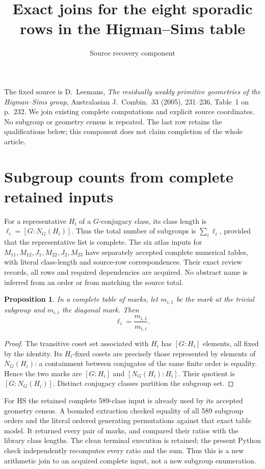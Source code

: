 \documentclass[11pt]{article}
\title{Exact joins for the eight sporadic rows in the Higman--Sims table}
\author{Source recovery component}
\date{}
\newtheorem{proposition}{Proposition}
\begin{document}
\maketitle
\noindent The fixed source is D.~Leemans, \emph{The residually weakly primitive
geometries of the Higman--Sims group}, Australasian J.~Combin.\ 33 (2005),
231--236, Table~1 on p.~232. We join existing complete computations and
explicit source coordinates. No subgroup or geometry census is repeated.
The last row retains the qualifications below; this component does not
claim completion of the whole article.

\section{Subgroup counts from complete retained inputs}
For a representative $H_i$ of a $G$-conjugacy class, its class length is
$\ell_i=[G:N_G(H_i)]$. Thus the total number of subgroups is
$\sum_i\ell_i$, provided that the representative list is complete.
The six atlas inputs for $M_{11},M_{12},J_1,M_{22},J_2,M_{23}$ have
separately accepted complete numerical tables, with literal class-length
and source-row correspondences. Their exact review records, all rows and
required dependencies are acquired. No abstract name is inferred from an
order or from matching the source total.

\begin{proposition}
In a complete table of marks, let $m_{i,1}$ be the mark at the trivial
subgroup and $m_{i,i}$ the diagonal mark. Then
\[
 \ell_i=\frac{m_{i,1}}{m_{i,i}}.
\]
\end{proposition}
\begin{proof}
The transitive coset set associated with $H_i$ has $[G:H_i]$ elements,
all fixed by the identity. Its $H_i$-fixed cosets are precisely those
represented by elements of $N_G(H_i)$: a containment between conjugates
of the same finite order is equality. Hence the two marks are
$[G:H_i]$ and $[N_G(H_i):H_i]$. Their quotient is $[G:N_G(H_i)]$.
Distinct conjugacy classes partition the subgroup set.
\end{proof}

For HS the retained complete 589-class input is already used by its
accepted geometry census. A bounded extraction checked equality of all
589 subgroup orders and the literal ordered generating permutations
against that exact table model. It returned every pair of marks, and
compared their ratios with the library class lengths. The clean terminal
execution is retained; the present Python check independently recomputes
every ratio and the sum. Thus this is a new arithmetic join to an acquired
complete input, not a new subgroup enumeration.
\end{document}
